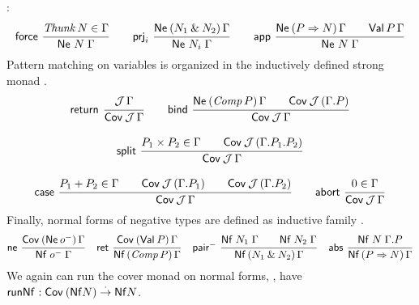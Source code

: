 \documentclass[a4paper,USenglish,cleveref, autoref]{lipics-v2019}
\begin{document}
:
\begin{gather*}
  \nru{\tforce}{\Thunk N \in \Gamma}{\Ne N \Gamma}
\qquad
  \nru{\tprj_i}
      {\NeP {N_1 \ntimes N_2} \Gamma}
      {\Ne {N_i} \Gamma}
\qquad
  \nru{\tapp}
      {\NeP {P \To N} \Gamma \qquad \PVal P \Gamma}
      {\Ne N \Gamma}
\end{gather*}
Pattern matching on variables is organized in the
inductively defined strong monad \fbox{$\Cov$}.
\begin{gather*}
  \nru{\treturn}{\J\,\Gamma}{\Cover \J \Gamma}
\qquad
  \nru{\tbind}
      {\NeP {\Comp P} \Gamma \qquad \Cover \J (\cext \Gamma P)}
      {\Cover \J \Gamma}
\\[2ex]
  \nru{\tsplit}
      {P_1 \times P_2 \in \Gamma \qquad
       \Cover \J (\cext {\cext \Gamma {P_1}} {P_2})
      }
      {\Cover \J \Gamma}
\\[2ex]
  \nru{\tcase}
      {P_1 + P_2 \in \Gamma
       \qquad \Cover \J (\cext \Gamma {P_1})
       \qquad \Cover \J (\cext \Gamma {P_2})
      }
      {\Cover \J \Gamma}
\qquad
  \nru{\tabort}
      {\tyempty \in \Gamma}
      {\Cover \J \Gamma}
\end{gather*}
Finally, normal forms of negative types are defined as inductive
family .
\begin{gather*}
  \nru{\tne}
      {\CoverP {\tNe\,\natom} \Gamma}
      {\Nf {\natom} \Gamma}
\quad
  \nru{\tret}
      {\CoverP {\tVal\,P}  \Gamma}
      {\NfP {\Comp P} \Gamma}
\quad
  \nru{\npair}
      {\Nf {N_1} \Gamma \qquad \Nf {N_2} \Gamma}
      {\NfP {N_1 \ntimes N_2} \Gamma}
\quad
  \nru{\tabs}
      {\Nf N {\cext \Gamma P}}
      {\NfP {P \To N} \Gamma}
\end{gather*}
We again can run the cover monad on normal forms, \ie, have
$\mathsf{runNf}^{} : \mathsf{Cov}^{}\,(\mathsf{Nf} N) \stackrel{\cdot}{\to} \mathsf{Nf} N$.
\end{document}
